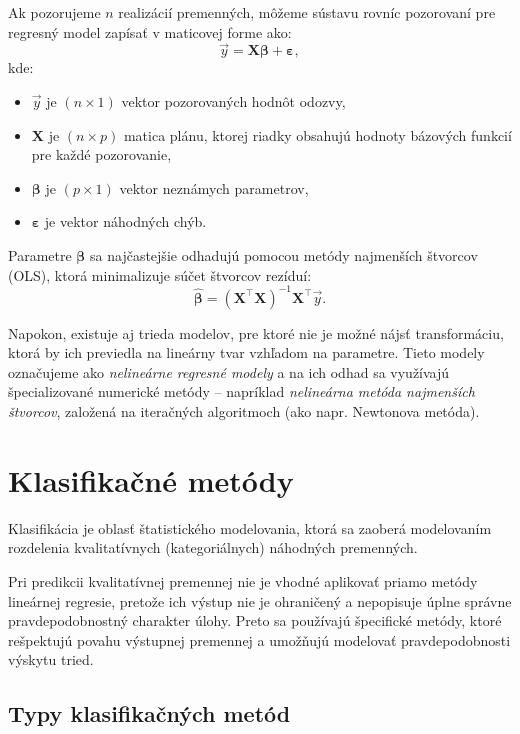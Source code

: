 Ak pozorujeme $n$ realizácií premenných, môžeme sústavu rovníc pozorovaní pre regresný model zapísať v maticovej forme ako:
\begin{equation}
\vec y = \mathbf{X} \boldsymbol{\beta} + \boldsymbol{\varepsilon},
\end{equation}
kde:
\begin{itemize}
  \item $\vec y$ je $(n \times 1)$ vektor pozorovaných hodnôt odozvy,
  \item $\mathbf{X}$ je $(n \times p)$ matica plánu, ktorej riadky obsahujú hodnoty bázových funkcií pre každé pozorovanie,
  \item $\boldsymbol{\beta}$ je $(p \times 1)$ vektor neznámych parametrov,
  \item $\boldsymbol{\varepsilon}$ je vektor náhodných chýb.
\end{itemize}
Parametre $\boldsymbol{\beta}$ sa najčastejšie odhadujú pomocou metódy najmenších štvorcov (OLS), ktorá minimalizuje súčet štvorcov rezíduí:
\[
\hat{\boldsymbol{\beta}} = (\mathbf{X}^\top \mathbf{X})^{-1} \mathbf{X}^\top \vec y.
\]

\smallskip
\noindent
Napokon, existuje aj trieda modelov, pre ktoré nie je možné nájsť transformáciu, ktorá by ich previedla na lineárny tvar vzhľadom na parametre. Tieto modely označujeme ako \textit{nelineárne regresné modely} a na ich odhad sa využívajú špecializované numerické metódy – napríklad \textit{nelineárna metóda najmenších štvorcov}, založená na iteračných algoritmoch (ako napr. Newtonova metóda).

\section{Klasifikačné metódy}\label{sec:classification}

Klasifikácia je oblasť štatistického modelovania, ktorá sa zaoberá modelovaním rozdelenia kvalitatívnych (kategoriálnych) náhodných premenných. 

Pri predikcii kvalitatívnej premennej nie je vhodné aplikovať priamo metódy lineárnej regresie, pretože ich výstup nie je ohraničený a nepopisuje úplne správne pravdepodobnostný charakter úlohy. Preto sa používajú špecifické metódy, ktoré rešpektujú povahu výstupnej premennej a umožňujú modelovať pravdepodobnosti výskytu tried.

\subsection*{Typy klasifikačných metód}

